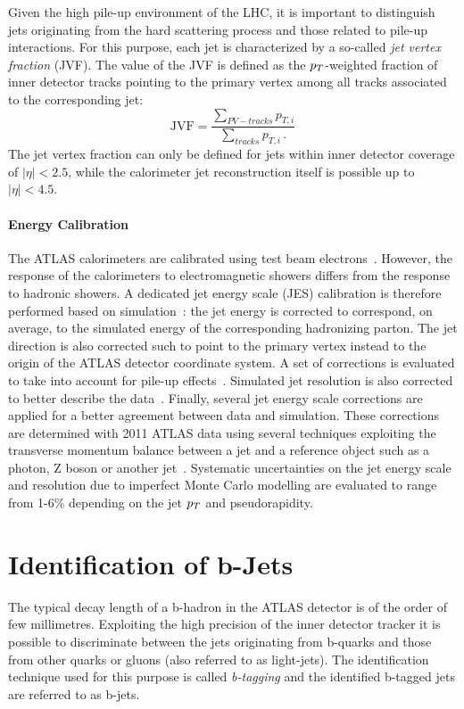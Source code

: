 Given the high pile-up environment of the LHC, it   is important to distinguish jets originating  from the hard scattering process and those
related to pile-up interactions. For this purpose, each jet is characterized by a so-called \emph{jet vertex fraction} (JVF).
The value of the JVF is defined as the $p_{T}$-weighted fraction of inner detector tracks pointing
to  the primary vertex among all tracks associated to the corresponding jet:
\begin{equation}
\text{JVF} = \frac{\sum\limits_{PV-tracks}p_{T,i}}{\sum\limits_{tracks}p_{T,i} \,.}
\end{equation} 
The jet vertex fraction  can only be defined for jets  within inner detector coverage of $|\eta| < 2.5$,
while the calorimeter jet reconstruction itself is possible up to $|\eta| < 4.5$.

\paragraph{Energy Calibration}
The ATLAS calorimeters are calibrated using test beam electrons~\cite{EMcalibration}. However,  the response of the calorimeters
to electromagnetic showers  differs from the response to hadronic showers. A dedicated jet energy scale
(JES) calibration is therefore performed based on simulation~\cite{jesinsitu}: 
the  jet energy is corrected to correspond, on average, to the simulated energy 
of the corresponding hadronizing parton. The jet direction  is also corrected such to point
to the primary vertex instead to the origin of the ATLAS detector coordinate system. A set of corrections is evaluated to take into account
for pile-up effects~\cite{jespileup, jesarea}. Simulated jet resolution is also corrected to better describe the data~\cite{jer}. 
Finally, several jet energy scale corrections are applied for a better agreement between 
data and simulation. These corrections are determined with 2011 ATLAS data using several techniques
exploiting the transverse momentum balance between a jet and a reference object such as a
photon, Z boson or another jet~\cite{jesinsitu, JES}. Systematic uncertainties on the jet energy scale and resolution  due to  
imperfect Monte Carlo modelling are evaluated to range from 1-6\% depending on the jet $p_{T}$ and pseudorapidity.


\section{Identification of b-Jets}
The typical decay length of a b-hadron in the  ATLAS detector is of the order of few millimetres. Exploiting the high precision of the
inner detector tracker it is possible to discriminate between the  jets originating from b-quarks 
and those from other quarks or gluons (also referred to as light-jets). The identification technique used for this purpose is called \emph{b-tagging}
and the identified b-tagged jets are referred to as b-jets.

